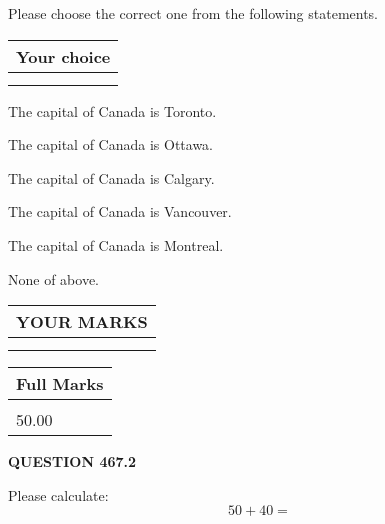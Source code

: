 \documentclass[12pt]{article}
\begin{document}
  
Please choose the correct one from the following statements.
  
  
\noindent\hspace{3.0in} \begin{tabular}{|l|}
\hline
Your choice \\
\hline
 \\ 
 \\ 
\hline
\end{tabular}
  
  
 
 
The capital of Canada is Toronto.
 
 
The capital of Canada is Ottawa.
 
 
The capital of Canada is Calgary.
 
 
The capital of Canada is Vancouver.
 
 
The capital of Canada is Montreal.
 
 
 None of above.
 
 
  
\vspace{0.2in}
  
\noindent\begin{tabular}{|l|}
\hline
 YOUR MARKS  \\
\hline
 \\ 
 \\ 
\hline
\end{tabular}
\hspace{0.05in} \begin{tabular}{|l|}
\hline
 Full Marks  \\
\hline
 \\ 
50.00 \\
\hline
\end{tabular}
{\textbf{\Large{QUESTION
467.2 
}}}
  
  
 
Please calculate:
\begin{equation}
50 +  %
40 = \nonumber
\end{equation}
 

 

 
   
   
 \vspace{0.2in}
 
   
   
   
   
\end{document}
